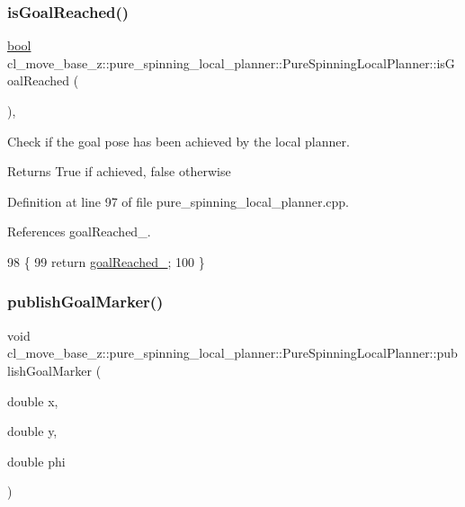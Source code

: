 \subsubsection{\texorpdfstring{is\+Goal\+Reached()}{isGoalReached()}}
{\footnotesize\ttfamily \hyperlink{classbool}{bool} cl\+\_\+move\+\_\+base\+\_\+z\+::pure\+\_\+spinning\+\_\+local\+\_\+planner\+::\+Pure\+Spinning\+Local\+Planner\+::is\+Goal\+Reached (\begin{DoxyParamCaption}{ }\end{DoxyParamCaption})\hspace{0.3cm}{\ttfamily [override]}, {\ttfamily [virtual]}}



Check if the goal pose has been achieved by the local planner. 

\begin{DoxyReturn}{Returns}
True if achieved, false otherwise 
\end{DoxyReturn}


Definition at line 97 of file pure\+\_\+spinning\+\_\+local\+\_\+planner.\+cpp.



References goal\+Reached\+\_\+.


\begin{DoxyCode}
98 \{
99   \textcolor{keywordflow}{return} \hyperlink{classcl__move__base__z_1_1pure__spinning__local__planner_1_1PureSpinningLocalPlanner_aecfe0dfc68b8c8e461e8b684e5fa4d2f}{goalReached\_};
100 \}
\end{DoxyCode}
\mbox{\label{classcl__move__base__z_1_1pure__spinning__local__planner_1_1PureSpinningLocalPlanner_acbabe6590b2d5fc90275180ac09db43e}} 
\subsubsection{\texorpdfstring{publish\+Goal\+Marker()}{publishGoalMarker()}}
{\footnotesize\ttfamily void cl\+\_\+move\+\_\+base\+\_\+z\+::pure\+\_\+spinning\+\_\+local\+\_\+planner\+::\+Pure\+Spinning\+Local\+Planner\+::publish\+Goal\+Marker (\begin{DoxyParamCaption}\item[{double}]{x,  }\item[{double}]{y,  }\item[{double}]{phi }\end{DoxyParamCaption})\hspace{0.3cm}{\ttfamily [private]}}

